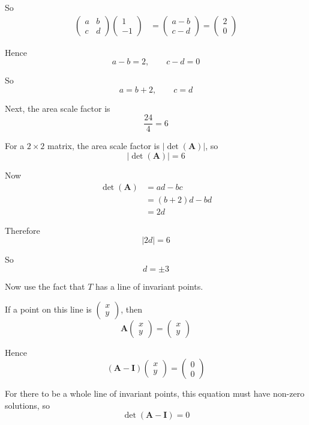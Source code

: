 \documentclass[leqno]{article}
\begin{document}
\begin{enumerate}[
  label=\textbf{\arabic*.},
  leftmargin=*,
  topsep=0pt,
  partopsep=0pt,
  parsep=0pt
]
\begin{djsSolution}
\begin{enumerate}[label=\textbf{(\roman*)}]
So
\begin{align*}
\begin{pmatrix}a&b\\ c&d\end{pmatrix}
\begin{pmatrix}1\\-1\end{pmatrix}
&=
\begin{pmatrix}a-b\\ c-d\end{pmatrix}
=
\begin{pmatrix}2\\0\end{pmatrix}
\end{align*}

Hence
\[
a-b=2,\qquad c-d=0
\]

So
\[
a=b+2,\qquad c=d
\]

Next, the area scale factor is
\[
\frac{24}{4}=6
\]

For a $2\times2$ matrix, the area scale factor is $|\det(\mathbf A)|$, so
\[
|\det(\mathbf A)|=6
\]

Now
\begin{align*}
\det(\mathbf A)&=ad-bc\\
&=(b+2)d-bd\\
&=2d
\end{align*}

Therefore
\[
|2d|=6
\]

So
\[
d=\pm3
\]

Now use the fact that $T$ has a line of invariant points.

If a point on this line is $\begin{pmatrix}x\\y\end{pmatrix}$, then
\[
\mathbf A\begin{pmatrix}x\\y\end{pmatrix}=\begin{pmatrix}x\\y\end{pmatrix}
\]

Hence
\[
(\mathbf A-\mathbf I)\begin{pmatrix}x\\y\end{pmatrix}=\begin{pmatrix}0\\0\end{pmatrix}
\]

For there to be a whole line of invariant points, this equation must have non-zero solutions, so
\[
\det(\mathbf A-\mathbf I)=0
\]


\end{enumerate}
\end{djsSolution}
\end{enumerate}
\end{document}
